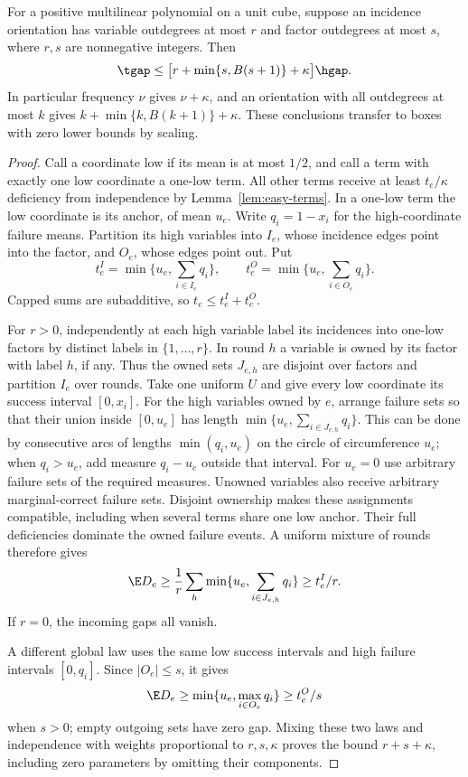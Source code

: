 \begin{theorem}\label{thm:incidence-orientation}
For a positive multilinear polynomial on a unit cube, suppose an incidence
orientation has variable outdegrees at most $r$ and factor outdegrees at
most $s$, where $r,s$ are nonnegative integers. Then
\[
 \tgap\le\bigl[r+\min\{s,B(s+1)\}+\kappa\bigr]\hgap.
\]
In particular frequency $\nu$ gives $\nu+\kappa$, and an orientation with
all outdegrees at most $k$ gives $k+\min\{k,B(k+1)\}+\kappa$.
These conclusions transfer to boxes with zero lower bounds by scaling.
\end{theorem}
\begin{proof}
Call a coordinate low if its mean is at most $1/2$, and call a term with
exactly one low coordinate a one-low term. All other terms receive
at least $t_e/\kappa$ deficiency from independence by
Lemma~\ref{lem:easy-terms}. In a one-low term the low coordinate is its
anchor, of mean $u_e$. Write $q_i=1-x_i$ for the high-coordinate failure
means. Partition its high variables into $I_e$, whose incidence edges
point into the factor, and $O_e$, whose edges point out. Put
\[
 t_e^I=\min\{u_e,\sum_{i\in I_e}q_i\},\qquad
 t_e^O=\min\{u_e,\sum_{i\in O_e}q_i\}.
\]
Capped sums are subadditive, so $t_e\le t_e^I+t_e^O$.

For $r>0$, independently at each high variable label its incidences into
one-low factors by distinct labels in $\{1,\ldots,r\}$. In round $h$ a
variable is owned by its factor with label $h$, if any. Thus the owned
sets $J_{e,h}$ are disjoint over factors and partition $I_e$ over rounds.
Take one uniform $U$ and give every low coordinate its success interval
$[0,x_i]$. For the high variables owned by $e$, arrange failure sets so
that their union inside $[0,u_e]$ has length
$\min\{u_e,\sum_{i\in J_{e,h}}q_i\}$. This can be done by consecutive
arcs of lengths $\min(q_i,u_e)$ on the circle of circumference $u_e$;
when $q_i>u_e$, add measure $q_i-u_e$ outside that interval. For $u_e=0$
use arbitrary failure sets of the required measures. Unowned variables
also receive arbitrary marginal-correct failure sets. Disjoint ownership
makes these assignments compatible, including when several terms share
one low anchor. Their full deficiencies dominate the owned failure events.
A uniform mixture of rounds therefore gives
\[
 \E D_e\ge\frac1r\sum_h\min\{u_e,\sum_{i\in J_{e,h}}q_i\}
 \ge t_e^I/r.
\]
If $r=0$, the incoming gaps all vanish.

A different global law uses the same low success intervals and high
failure intervals $[0,q_i]$. Since $|O_e|\le s$, it gives
\[
 \E D_e\ge\min\{u_e,\max_{i\in O_e}q_i\}\ge t_e^O/s
\]
when $s>0$; empty outgoing sets have zero gap. Mixing these two laws and
independence with weights proportional to $r,s,\kappa$ proves the bound
$r+s+\kappa$, including zero parameters by omitting their components.


\end{proof}
